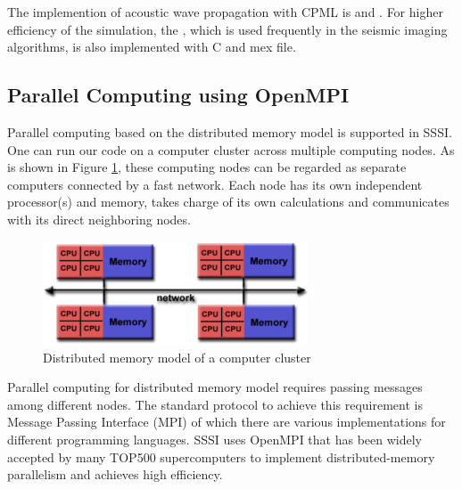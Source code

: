 \documentclass[11pt]{article}
\theoremstyle{plain}
\theoremstyle{definition}
\theoremstyle{remark}
\numberwithin{equation}{section}
\begin{document}
The implemention of acoustic wave propagation with CPML is  and .
For higher efficiency of the simulation, the , which is used frequently in the seismic imaging algorithms, is also implemented with C and mex file. 


\subsection{Parallel Computing using OpenMPI}
Parallel computing based on the distributed memory model is supported in SSSI. One can run our code on a computer cluster across multiple computing nodes. As is shown in Figure \ref{fig:distrMemModel}, these computing nodes can be regarded as separate computers connected by a fast network. Each node has its own independent processor(s) and memory, takes charge of its own calculations and communicates with its direct neighboring nodes.
\begin{figure}[htbp]
\centering
\includegraphics[width=0.7\textwidth]{Fig/MPI_MultipleCPU.pdf}
\caption{Distributed memory model of a computer cluster}
\label{fig:distrMemModel}
\end{figure}

Parallel computing for distributed memory model requires passing messages among different nodes. The standard protocol to achieve this requirement is Message Passing Interface (MPI) of which there are various implementations for different programming languages. SSSI uses OpenMPI\cite{Gabriel:2004aa} that has been widely accepted by many TOP500 supercomputers to implement distributed-memory parallelism and achieves high efficiency.
\end{document}
